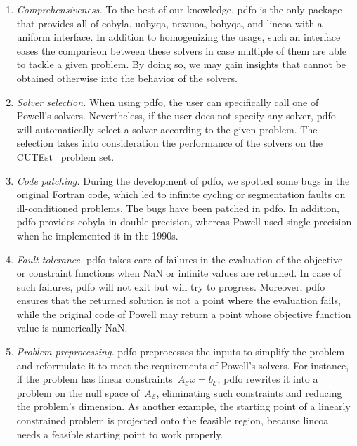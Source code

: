 \documentclass[
    smallextended,  %
    final,        %
]{svjour3}
\newcommand{\aeq}{A_{\scriptscriptstyle\mathcal{E}}}
\newcommand{\beq}{b_{\scriptscriptstyle\mathcal{E}}}
\begin{document}
\begin{enumerate}
    \item \emph{Comprehensiveness.}
    To the best of our knowledge, \gls{pdfo} is the only package that provides all of \gls{cobyla}, \gls{uobyqa}, \gls{newuoa}, \gls{bobyqa}, and \gls{lincoa} with a uniform interface.
    In addition to homogenizing the usage, such an interface eases the comparison between these solvers in case multiple of them are able to tackle a given problem.
    By doing so, we may gain insights that cannot be obtained otherwise into the behavior of the solvers.

    \item \emph{Solver selection.}
    When using \gls{pdfo}, the user can specifically call one of Powell's solvers. Nevertheless, if the user does not specify any solver, \gls{pdfo} will automatically select a solver according to the given problem.
    The selection takes into consideration the performance of the solvers on the CUTEst~\cite{Gould_Orban_Toint_2015} problem set.

    \item \emph{Code patching.}
    During the development of \gls{pdfo}, we spotted some bugs in the original Fortran code, which led to infinite cycling or segmentation faults on ill-conditioned problems.
    The bugs have been patched in \gls{pdfo}.
    In addition, \gls{pdfo} provides \gls{cobyla} in double precision, whereas Powell used single precision when he implemented it in the 1990s.

    \item \emph{Fault tolerance.}
    \Gls{pdfo} takes care of failures in the evaluation of the objective or constraint functions when NaN or infinite values are returned.
    In case of such failures, \gls{pdfo} will not exit but will try to progress.
    Moreover, \gls{pdfo} ensures that the returned solution is not a point where the evaluation fails, while the original code of Powell may return a point whose objective function value is numerically NaN.

    \item \emph{Problem preprocessing.}
    \Gls{pdfo} preprocesses the inputs to simplify the problem and reformulate it to meet the requirements of Powell's solvers.
    For instance, if the problem has linear constraints~$\aeq x = \beq$, \gls{pdfo} rewrites it into a problem on the null space of~$\aeq$, eliminating such constraints and reducing the problem's dimension.
    As another example, the starting point of a linearly constrained problem is projected onto the feasible region, because \gls{lincoa} needs a feasible starting point to work properly.


\end{enumerate}
\end{document}
